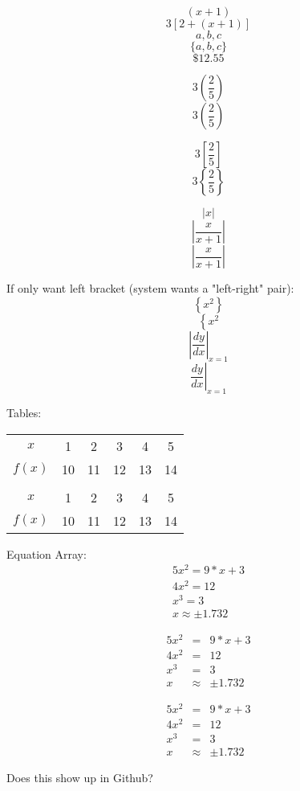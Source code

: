 \documentclass[11pt]{article}
\begin{document}
$$(x+1)$$
$$3[2+(x+1)]$$
$${a,b,c}$$
$$\{a,b,c\}$$
$$\$12.55$$

$$3(\frac{2}{5})$$	%
$$3\left(\frac{2}{5}\right)$$

$$3\left[\frac{2}{5}\right]$$
$$3\left\{\frac{2}{5}\right\}$$

$$|x|$$
$$|\frac{x}{x+1}|$$	%
$$\left|\frac{x}{x+1}\right|$$

If only want left bracket (system wants a "left-right" pair):
$$\left\{x^2\right\}$$
$$\left\{x^2\right.$$
$$\left|\frac{dy}{dx} \right|_{x=1}$$	%
$$\left.\frac{dy}{dx} \right|_{x=1}$$

Tables:

\begin{tabular}{|c|c|cccc|}	%

\hline
$x$ & 1 & 2 & 3 & 4 & 5 \\
$f(x)$ & 10 & 11 & 12 & 13 & 14 \\
\\
$x$ & 1 & 2 & 3 & 4 & 5 \\ \hline
$f(x)$ & 10 & 11 & 12 & 13 & 14\\	\hline
\end{tabular}

Equation Array:
\begin{eqnarray}
5x^2=9*x+3 \\
4x^2 = 12 \\
x^3 = 3 \\
x\approx\pm 1.732
\end{eqnarray}

\begin{eqnarray}
5x^2&=&9*x+3 \\
4x^2 &=& 12 \\
x^3 &=& 3 \\
x&\approx&\pm 1.732
\end{eqnarray}

\begin{eqnarray*}
5x^2&=&9*x+3 \\
4x^2 &=& 12 \\
x^3 &=& 3 \\
x&\approx&\pm 1.732
\end{eqnarray*}

Does this show up in Github?
\end{document}
